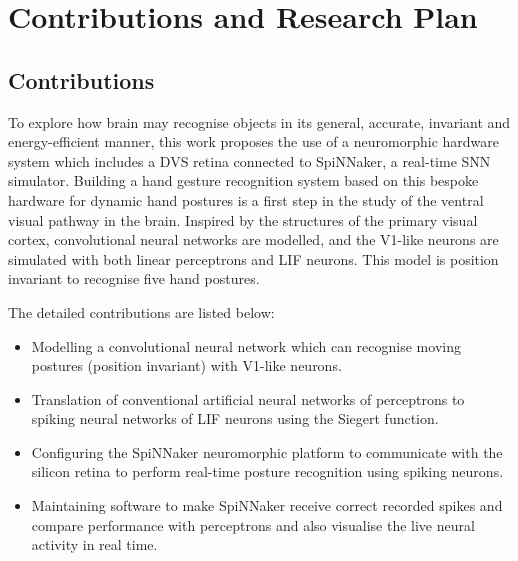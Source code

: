 \chapter{Contributions and Research Plan}
\label{cha:plan}
\section{Contributions}
To explore how brain may recognise objects in its general, accurate, invariant and energy-efficient manner, this work proposes the use of a neuromorphic hardware system which includes a DVS retina connected to SpiNNaker, a real-time SNN simulator.
Building a hand gesture recognition system based on this bespoke hardware for dynamic hand postures is a first step in the study of the ventral visual pathway in the brain.
Inspired by the structures of the primary visual cortex, convolutional neural networks are modelled, and the V1-like neurons are simulated with both linear perceptrons and LIF neurons.
This model is position invariant to recognise five hand postures.


The detailed contributions are listed below:
\begin{itemize}
	\item Modelling a convolutional neural network which can recognise moving postures (position invariant) with V1-like neurons.
	\item Translation of conventional artificial neural networks of perceptrons to spiking neural networks of LIF neurons using the Siegert function.
	\item Configuring the SpiNNaker neuromorphic platform to communicate with the silicon retina to perform real-time posture recognition using spiking neurons.
	\item Maintaining software to make SpiNNaker receive correct recorded spikes and compare performance with perceptrons and also visualise the live neural activity in real time.
\end{itemize}
	
